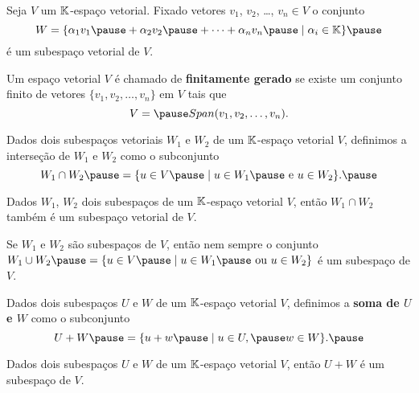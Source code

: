 \documentclass{beamer}
\begin{document}
\begin{frame}
  \begin{proposicao}
    Seja $V$ um $\mathbb{K}$-espaço vetorial. \pause Fixado vetores $v_1$, $v_2$, \dots, $v_n \in V$ \pause o conjunto
    \[
      W = \{\alpha_1v_1 \pause + \alpha_2v_2 \pause + \cdots + \alpha_nv_n \pause \mid \alpha_i \in \cp{K}\}\pause
    \]
    é um subespaço vetorial de $V$.
  \end{proposicao}
\end{frame}

\begin{frame}
  \begin{definicao}
    Um espaço vetorial $V$ é chamado de \textbf{finitamente gerado} \pause se existe um conjunto finito \pause de vetores $\{v_1, v_2, \dots, v_n\}$ em $V$ \pause tais que\pause
    \[
      V = \pause Span(v_1, v_2, \dots, v_n).
    \]
  \end{definicao}
\end{frame}

\begin{frame}
  \begin{definicao}
    Dados dois subespaços vetoriais $W_1$ \pause e $W_2$ \pause de um $\mathbb{K}$-espaço vetorial $V$, \pause definimos a interseção de $W_1$ e $W_2$ \pause como o subconjunto
    \[
      W_1 \cap W_2 \pause = \{u \in V \pause \mid u\in W_1\pause \mbox{ e } u \in W_2\}.\pause
    \]
  \end{definicao}

  \vspace{1cm}

  \begin{teorema}
    Dados $W_1$, $W_2$ dois subespaços de um $\mathbb{K}$-espaço vetorial $V$, \pause então $W_1 \cap W_2$ também é um subespaço vetorial de $V$.
  \end{teorema}
\end{frame}

\begin{frame}
  \begin{observacao}
    Se $W_1$ e $W_2$ são subespaços de $V$, \pause então nem sempre o conjunto $W_1 \cup W_2 \pause = \{u \in V \pause \mid u \in W_1 \pause \mbox{ ou } u \in W_2\}$ \pause é um subespaço de $V$.
  \end{observacao}
\end{frame}

\begin{frame}
  \begin{definicao}
    Dados dois subespaços $U$ e $W$ \pause de um $\mathbb{K}$-espaço vetorial $V$, \pause definimos a \textbf{soma de $U$ e $W$} \pause como o subconjunto
    \[
      U + W \pause = \{u + w \pause \mid u \in U, \pause w \in W\}.\pause
    \]
  \end{definicao}

  \vspace*{1cm}

  \begin{teorema}
    Dados dois subespaços $U$ e $W$ de um $\mathbb{K}$-espaço vetorial $V$, \pause então $U + W$ é um subespaço de $V$.
  \end{teorema}
\end{frame}
\end{document}

